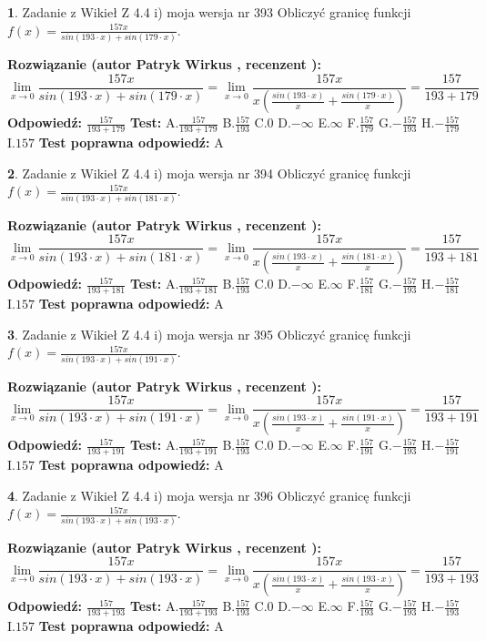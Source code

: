\documentclass[12pt, a4paper]{article}
\theoremstyle{definition} %
\newtheorem{zad}{}
\newcommand{\zadStart}[1]{\begin{zad}#1\newline}
\newcommand{\zadStop}{\end{zad}}
\newcommand{\rozwStart}[2]{\noindent \textbf{Rozwiązanie (autor #1 , recenzent #2): }\newline}
\newcommand{\rozwStop}{\newline}
\newcommand{\odpStart}{\noindent \textbf{Odpowiedź:}\newline}
\newcommand{\odpStop}{\newline}
\newcommand{\testStart}{\noindent \textbf{Test:}\newline}
\newcommand{\testStop}{\newline}
\newcommand{\kluczStart}{\noindent \textbf{Test poprawna odpowiedź:}\newline}
\newcommand{\kluczStop}{\newline}
\begin{document}
\zadStart{Zadanie z Wikieł Z 4.4 i) moja wersja nr 393}
Obliczyć granicę funkcji $f(x)=\frac{157x}{sin(193\cdot x) +sin(179\cdot x)}$.
\zadStop
\rozwStart{Patryk Wirkus}{}
$$\lim\limits_{x\to 0}\frac{157x}{sin(193\cdot x) +sin(179\cdot x)}=\lim\limits_{x\to 0}\frac{157x}{x(\frac{sin(193\cdot x)}{x}+\frac{sin(179\cdot x)}{x})}=\frac{157}{193+179}$$
\rozwStop
\odpStart
$\frac{157}{193+179}$
\odpStop
\testStart
A.$\frac{157}{193+179}$
B.$\frac{157}{193}$
C.$0$
D.$-\infty$
E.$\infty$
F.$\frac{157}{179}$
G.$-\frac{157}{193}$
H.$-\frac{157}{179}$
I.$157$
\testStop
\kluczStart
A
\kluczStop



\zadStart{Zadanie z Wikieł Z 4.4 i) moja wersja nr 394}
Obliczyć granicę funkcji $f(x)=\frac{157x}{sin(193\cdot x) +sin(181\cdot x)}$.
\zadStop
\rozwStart{Patryk Wirkus}{}
$$\lim\limits_{x\to 0}\frac{157x}{sin(193\cdot x) +sin(181\cdot x)}=\lim\limits_{x\to 0}\frac{157x}{x(\frac{sin(193\cdot x)}{x}+\frac{sin(181\cdot x)}{x})}=\frac{157}{193+181}$$
\rozwStop
\odpStart
$\frac{157}{193+181}$
\odpStop
\testStart
A.$\frac{157}{193+181}$
B.$\frac{157}{193}$
C.$0$
D.$-\infty$
E.$\infty$
F.$\frac{157}{181}$
G.$-\frac{157}{193}$
H.$-\frac{157}{181}$
I.$157$
\testStop
\kluczStart
A
\kluczStop



\zadStart{Zadanie z Wikieł Z 4.4 i) moja wersja nr 395}
Obliczyć granicę funkcji $f(x)=\frac{157x}{sin(193\cdot x) +sin(191\cdot x)}$.
\zadStop
\rozwStart{Patryk Wirkus}{}
$$\lim\limits_{x\to 0}\frac{157x}{sin(193\cdot x) +sin(191\cdot x)}=\lim\limits_{x\to 0}\frac{157x}{x(\frac{sin(193\cdot x)}{x}+\frac{sin(191\cdot x)}{x})}=\frac{157}{193+191}$$
\rozwStop
\odpStart
$\frac{157}{193+191}$
\odpStop
\testStart
A.$\frac{157}{193+191}$
B.$\frac{157}{193}$
C.$0$
D.$-\infty$
E.$\infty$
F.$\frac{157}{191}$
G.$-\frac{157}{193}$
H.$-\frac{157}{191}$
I.$157$
\testStop
\kluczStart
A
\kluczStop



\zadStart{Zadanie z Wikieł Z 4.4 i) moja wersja nr 396}
Obliczyć granicę funkcji $f(x)=\frac{157x}{sin(193\cdot x) +sin(193\cdot x)}$.
\zadStop
\rozwStart{Patryk Wirkus}{}
$$\lim\limits_{x\to 0}\frac{157x}{sin(193\cdot x) +sin(193\cdot x)}=\lim\limits_{x\to 0}\frac{157x}{x(\frac{sin(193\cdot x)}{x}+\frac{sin(193\cdot x)}{x})}=\frac{157}{193+193}$$
\rozwStop
\odpStart
$\frac{157}{193+193}$
\odpStop
\testStart
A.$\frac{157}{193+193}$
B.$\frac{157}{193}$
C.$0$
D.$-\infty$
E.$\infty$
F.$\frac{157}{193}$
G.$-\frac{157}{193}$
H.$-\frac{157}{193}$
I.$157$
\testStop
\kluczStart
A
\kluczStop
\end{document}
